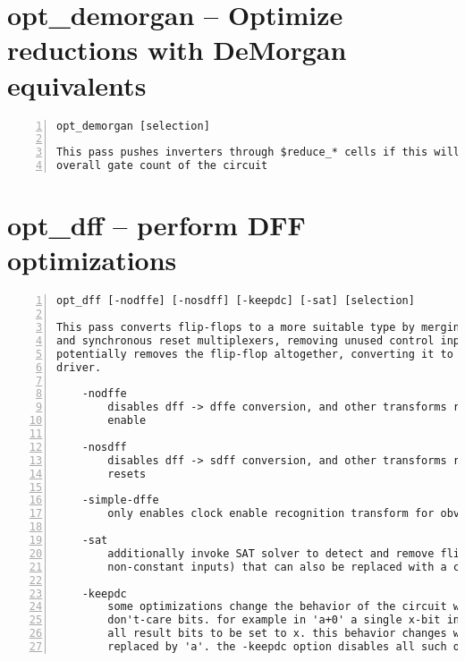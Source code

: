 \section{opt\_demorgan -- Optimize reductions with DeMorgan equivalents}
\label{cmd:opt_demorgan}
\begin{lstlisting}[numbers=left,frame=single]
    opt_demorgan [selection]

This pass pushes inverters through $reduce_* cells if this will reduce the
overall gate count of the circuit
\end{lstlisting}

\section{opt\_dff -- perform DFF optimizations}
\label{cmd:opt_dff}
\begin{lstlisting}[numbers=left,frame=single]
    opt_dff [-nodffe] [-nosdff] [-keepdc] [-sat] [selection]

This pass converts flip-flops to a more suitable type by merging clock enables
and synchronous reset multiplexers, removing unused control inputs, or
potentially removes the flip-flop altogether, converting it to a constant
driver.

    -nodffe
        disables dff -> dffe conversion, and other transforms recognizing clock
        enable

    -nosdff
        disables dff -> sdff conversion, and other transforms recognizing sync
        resets

    -simple-dffe
        only enables clock enable recognition transform for obvious cases

    -sat
        additionally invoke SAT solver to detect and remove flip-flops (with
        non-constant inputs) that can also be replaced with a constant driver

    -keepdc
        some optimizations change the behavior of the circuit with respect to
        don't-care bits. for example in 'a+0' a single x-bit in 'a' will cause
        all result bits to be set to x. this behavior changes when 'a+0' is
        replaced by 'a'. the -keepdc option disables all such optimizations.
\end{lstlisting}

